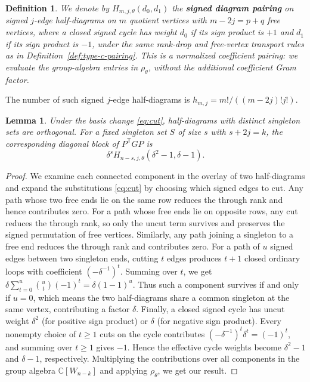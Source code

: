 \documentclass[11pt,a4paper]{amsart}
\newtheorem{lemma}[theorem]{Lemma}
\theoremstyle{uprightdefinition}
\newtheorem{definition}[theorem]{Definition}
\theoremstyle{remark}\newtheorem{remark}[theorem]{Remark}
\begin{document}
\begin{definition}\label{def:signed-pairing}
We denote by $H_{m,j,\theta}(d_0,d_1)$ the
\textbf{signed diagram pairing} on signed $j$-edge half-diagrams
on $m$ quotient vertices with $m-2j=p+q$ free vertices, where a closed signed cycle
has weight $d_0$ if its sign product is $+1$ and $d_1$ if its sign product is $-1$, under the
same rank-drop and free-vertex transport rules as in
Definition~\ref{def:type-c-pairing}. This is a normalized coefficient
pairing: we evaluate the group-algebra entries in $\rho_\theta$, without
the additional coefficient Gram factor.
\end{definition}

The number of such signed $j$-edge half-diagrams is
$h_{m,j}=m!/((m-2j)!j!)$.
\begin{lemma}\label{lem:singleton-gram}
Under the basis change \eqref{eq:cut}, half-diagrams with distinct singleton sets are orthogonal.
For a fixed singleton set $S$ of size $s$ with $s+2j=k$, the corresponding diagonal block of
$P^{\mathsf T}GP$ is
\[
 \delta^s H_{n-s,j,\theta}(\delta^2-1,\delta-1).
\]
\end{lemma}
\begin{proof}
We examine each connected component in the overlay of two half-diagrams and expand the substitutions \eqref{eq:cut} by choosing which signed
edges to cut. Any path whose two free ends lie on the same
row reduces the through rank and hence contributes zero. For a path whose free ends lie on opposite rows,
any cut reduces the through rank, so only the uncut term survives and preserves the signed permutation of free vertices.
Similarly, any path joining a singleton to a free end reduces the through rank and contributes zero.
For a path of $u$ signed edges between two singleton ends, cutting $t$ edges produces
$t+1$ closed ordinary loops with coefficient $(-\delta^{-1})^t$. Summing over $t$, we get
$\delta\sum_{t=0}^u\binom ut(-1)^t=\delta(1-1)^u$.
Thus such a component survives if and only if $u=0$, which means the two half-diagrams share a common singleton at the same vertex, contributing a factor $\delta$.
Finally, a closed signed cycle has uncut weight $\delta^2$ (for positive sign product) or $\delta$ (for negative sign product).
Every nonempty choice of $t\ge1$ cuts on the cycle contributes $(-\delta^{-1})^t\delta^t=(-1)^t$,
and summing over $t\ge1$ gives $-1$. Hence the effective cycle weights become $\delta^2-1$ and $\delta-1$, respectively.
Multiplying the contributions over all components in the group algebra $\mathbb C[W_{n-k}]$ and applying $\rho_\theta$, we get our result.
\end{proof}
\end{document}
